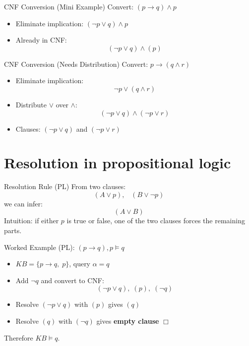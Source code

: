 \documentclass[aspectratio=169]{beamer}
\begin{document}
\begin{frame}{CNF Conversion (Mini Example)}
  Convert: $(p \rightarrow q) \land p$
  \begin{itemize}[<+->]
    \item Eliminate implication: $(\lnot p \lor q) \land p$
    \item Already in CNF:
    \[
      (\lnot p \lor q) \land (p)
    \]
  \end{itemize}
\end{frame}

\begin{frame}{CNF Conversion (Needs Distribution)}
  Convert: $p \rightarrow (q \land r)$
  \begin{itemize}[<+->]
    \item Eliminate implication:
    \[
      \lnot p \lor (q \land r)
    \]
    \item Distribute $\lor$ over $\land$:
    \[
      (\lnot p \lor q) \land (\lnot p \lor r)
    \]
    \item Clauses: $(\lnot p \lor q)$ and $(\lnot p \lor r)$
  \end{itemize}
\end{frame}

\section{Resolution in propositional logic}
\label{sec:respl}

\begin{frame}{Resolution Rule (PL)}
  From two clauses:
  \[
    (A \lor p),\;\;\; (B \lor \lnot p)
  \]
  we can infer:
  \[
    (A \lor B)
  \]
  \vspace{0.4em}
  Intuition: if either $p$ is true or false, one of the two clauses forces the remaining parts.
\end{frame}

\begin{frame}{Worked Example (PL): $(p\rightarrow q), p \models q$}
  \begin{itemize}[<+->]
    \item $KB = \{p \rightarrow q,\; p\}$, query $\alpha = q$
    \item Add $\lnot q$ and convert to CNF:
    \[
      (\lnot p \lor q),\; (p),\; (\lnot q)
    \]
    \item Resolve $(\lnot p \lor q)$ with $(p)$ gives $(q)$
    \item Resolve $(q)$ with $(\lnot q)$ gives \textbf{empty clause} $\Box$
  \end{itemize}
  Therefore $KB \models q$.
\end{frame}
\end{document}
